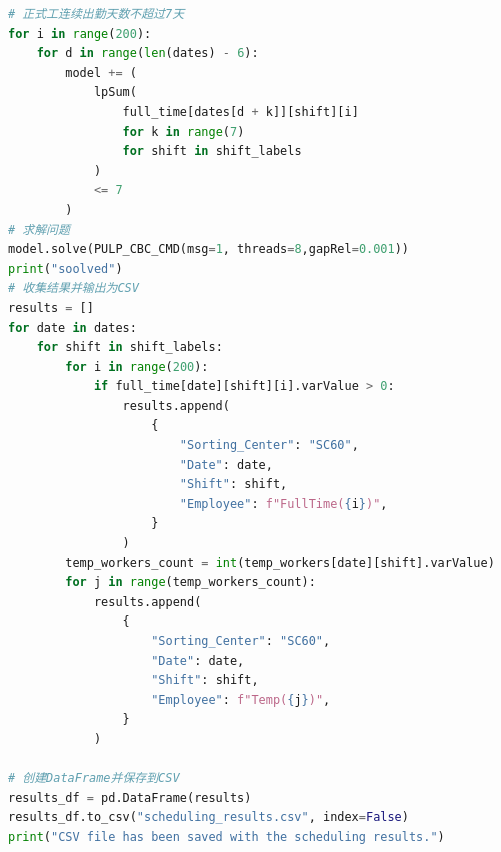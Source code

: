 \documentclass[UTF8,a4paper,10 pt]{article}%
\begin{document}
\begin{lstlisting}[language=python]
# 正式工连续出勤天数不超过7天
for i in range(200):
    for d in range(len(dates) - 6):
        model += (
            lpSum(
                full_time[dates[d + k]][shift][i]
                for k in range(7)
                for shift in shift_labels
            )
            <= 7
        )
# 求解问题
model.solve(PULP_CBC_CMD(msg=1, threads=8,gapRel=0.001))
print("soolved")
# 收集结果并输出为CSV
results = []
for date in dates:
    for shift in shift_labels:
        for i in range(200):
            if full_time[date][shift][i].varValue > 0:
                results.append(
                    {
                        "Sorting_Center": "SC60",
                        "Date": date,
                        "Shift": shift,
                        "Employee": f"FullTime({i})",
                    }
                )
        temp_workers_count = int(temp_workers[date][shift].varValue)
        for j in range(temp_workers_count):
            results.append(
                {
                    "Sorting_Center": "SC60",
                    "Date": date,
                    "Shift": shift,
                    "Employee": f"Temp({j})",
                }
            )

# 创建DataFrame并保存到CSV
results_df = pd.DataFrame(results)
results_df.to_csv("scheduling_results.csv", index=False)
print("CSV file has been saved with the scheduling results.")
\end{lstlisting}
\end{document}

